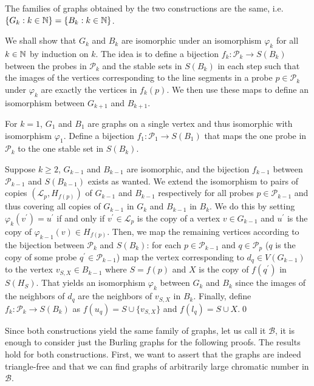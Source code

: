 \begin{lemma}
The families of graphs obtained by the two constructions are the same, i.e. $\lbrace G_k :k\in\mathbb{N}\rbrace=\lbrace B_k :k\in\mathbb{N}\rbrace$. 
\end{lemma}
\begin{prf}
We shall show that $G_k$ and $B_k$ are isomorphic under an isomorphism $\varphi_k$ for all $k\in\mathbb{N}$ by induction on $k$. The idea is to define a bijection $f_k:\mathcal{P}_k\to S(B_k)$ between the probes in $\mathcal{P}_k$ and the stable sets in $S(B_k)$ in each step such that the images of the vertices corresponding to the line segments in a probe $p\in\mathcal{P}_k$ under $\varphi_k$ are exactly the vertices in $f_k(p)$. We then use these maps to define an isomorphism between $G_{k+1}$ and $B_{k+1}$.

For $k=1$, $G_1$ and $B_1$ are graphs on a single vertex and thus isomorphic with isomorphism $\varphi_1$. Define a bijection $f_1:\mathcal{P}_1\to S(B_1)$ that maps the one probe in $\mathcal{P}_k$ to the one stable set in $S(B_k)$.

Suppose $k\geq 2$, $G_{k-1}$ and $B_{k-1}$ are isomorphic, and the bijection $f_{k-1}$ between $\mathcal{P}_{k-1}$ and $S(B_{k-1})$ exists as wanted. We extend the isomorphism to pairs of copies $(\mathcal{L}_p, H_{f(p)})$ of $G_{k-1}$ and $B_{k-1}$ respectively for all probes $p\in \mathcal{P}_{k-1}$ and thus covering all copies of $G_{k-1}$ in $G_k$ and $B_{k-1}$ in $B_{k}$. We do this by setting $\varphi_k (v^\prime)=u^\prime$ if and only if $v^\prime\in \mathcal{L}_p$ is the copy of a vertex $v\in G_{k-1}$ and $u^\prime$ is the copy of $\varphi_{k-1}(v)\in H_{f(p)}$. Then, we map the remaining vertices according to the bijection between $\mathcal{P}_k$ and $S(B_k)$: for each $p\in\mathcal{P}_{k-1}$ and $q\in\mathcal{P}_p$ ($q$ is the copy of some probe $q^\prime\in\mathcal{P}_{k-1}$) map the vertex corresponding to $d_q\in V(G_{k-1})$ to the vertex $v_{S,X}\in B_{k-1}$ where $S=f(p)$ and $X$ is the copy of $f(q^\prime)$ in $S(H_S)$. That yields an isomorphism $\varphi_k$ between $G_k$ and $B_k$ since the images of the neighbors of $d_q$ are the neighbors of $v_{S,X}$ in $B_k$. Finally, define $f_k:\mathcal{P}_k\to S(B_k)$ as $f(u_q)= S\cup \lbrace v_{S,X}\rbrace$ and $f(l_q)= S\cup X$.\qed
\end{prf}

Since both constructions yield the same family of graphs, let us call it $\mathcal{B}$, it is enough to consider just the Burling graphs for the following proofs. The results hold for both constructions. First, we want to assert that the graphs are indeed triangle-free and that we can find graphs of arbitrarily large chromatic number in $\mathcal{B}$.


